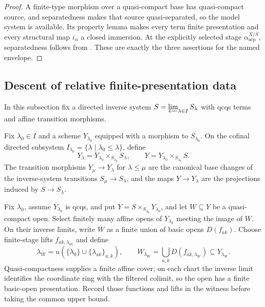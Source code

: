 \begin{proof}
  A finite-type morphism over a quasi-compact base has quasi-compact source,
  and separatedness makes that source quasi-separated, so the model system is
  available.  Its property lemma makes every term finite presentation and
  every structural map $i_\alpha$ a closed immersion.  At the explicitly
  selected stage $\alpha^{X/S}_{\mathrm{sep}}$, separatedness follows from
  .  These are exactly the
  three assertions for the named envelope.
\end{proof}


\subsection{Descent of relative finite-presentation data}

In this subsection fix a directed inverse system
$S=\varprojlim_{\lambda\in I}S_\lambda$ with qcqs terms and affine
transition morphisms.

\begin{definition}
  \label{def:nagata-basechanged-system}

  Fix $\lambda_0\in I$ and a scheme $Y_{\lambda_0}$ equipped with a morphism
  to $S_{\lambda_0}$.  On the cofinal directed subsystem
  $I_{\lambda_0}=\{\lambda\mid\lambda_0\leq\lambda\}$, define
  \[
    Y_\lambda=Y_{\lambda_0}\times_{S_{\lambda_0}}S_\lambda,
    \qquad
    Y=Y_{\lambda_0}\times_{S_{\lambda_0}}S.
  \]
  The transition morphisms $Y_\mu\to Y_\lambda$ for
  $\lambda\leq\mu$ are the canonical base changes of the inverse-system
  transitions $S_\mu\to S_\lambda$, and the maps $Y\to Y_\lambda$ are the
  projections induced by $S\to S_\lambda$.
\end{definition}

\begin{definition}
  \label{def:nagata-qc-open-descent}

  Fix $\lambda_0$, assume $Y_{\lambda_0}$ is qcqs, and put
  $Y=S\times_{S_{\lambda_0}}Y_{\lambda_0}$, and let $W\subseteq Y$ be a
  quasi-compact open.  Select finitely many affine opens of
  $Y_{\lambda_0}$ meeting the image of $W$.  On their inverse limits, write
  $W$ as a finite union of basic opens $D(f_{ak})$.  Choose finite-stage
  lifts $f_{ak,\lambda_{ak}}$ and define
  \[
    \lambda_W=u(\{\lambda_0\}\cup\{\lambda_{ak}\}_{a,k}),
    \qquad
    W_{\lambda_W}=\bigcup_{a,k}D(f_{ak,\lambda_W})
      \subseteq Y_{\lambda_W}.
  \]
  Quasi-compactness supplies a finite affine cover; on each chart the inverse
  limit identifies the coordinate ring with the filtered colimit, so the open
  has a finite basic-open presentation. Record those functions and lifts in
  the witness before taking the common upper bound.
\end{definition}

